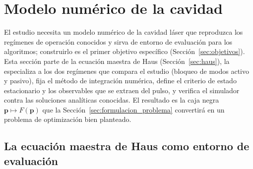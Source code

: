 
\section{Modelo numérico de la cavidad}
\label{sec:modelo_numerico}

El estudio necesita un modelo numérico de la cavidad láser que reproduzca los regímenes de operación conocidos y sirva de entorno de evaluación para los algoritmos; construirlo es el primer objetivo específico (Sección~\ref{sec:objetivos}). Esta sección parte de la ecuación maestra de Haus (Sección~\ref{sec:haus}), la especializa a los dos regímenes que compara el estudio (bloqueo de modos activo y pasivo), fija el método de integración numérica, define el criterio de estado estacionario y los observables que se extraen del pulso, y verifica el simulador contra las soluciones analíticas conocidas. El resultado es la caja negra $\mathbf{p}\mapsto F(\mathbf{p})$ que la
Sección~\ref{sec:formulacion_problema} convertirá en un problema de optimización
bien planteado.

\subsection{La ecuación maestra de Haus como entorno de evaluación}
\label{sec:sim_entorno}

